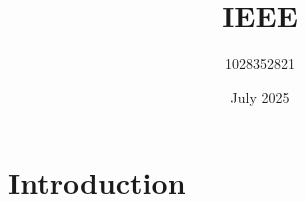 \documentclass{article}
\title{IEEE}
\author{1028352821 }
\date{July 2025}
\begin{document}
\maketitle

\section{Introduction}
\end{document}
